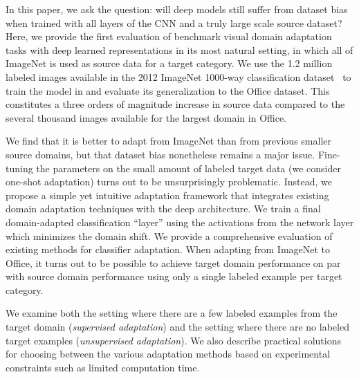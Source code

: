 In this paper, we ask the question: will deep models still suffer from dataset
bias when trained with all layers of the CNN and a truly large scale source
dataset?
Here, we provide the first evaluation of benchmark visual domain adaptation tasks
with deep learned representations in its most natural setting, in which all of
ImageNet is used as source data for a target category.  We use the 1.2 million
labeled images available in the 2012 ImageNet 1000-way classification
dataset~\cite{ilsvrc2012} to train the model in \cite{supervision} and evaluate
its generalization to the Office dataset. This constitutes a three
orders of magnitude increase in source data compared to the several thousand
images available for the largest domain in Office.

We find that it is better to adapt from ImageNet than from previous smaller source domains, but  that dataset bias nonetheless remains a major issue. Fine-tuning the parameters on the small amount of labeled target data (we consider one-shot adaptation) turns out to be unsurprisingly problematic. Instead, we propose a simple yet intuitive adaptation framework that integrates existing domain adaptation techniques with the deep architecture. We train a final domain-adapted classification ``layer'' using the activations from the network layer which minimizes the domain shift. 
We provide a comprehensive evaluation of existing methods for classifier adaptation.
When adapting from ImageNet to Office, it turns out to be possible to achieve target domain performance on par with source domain performance using only a single labeled example per target category. 

We examine both the setting where there are a few labeled examples from the target domain (\emph{supervised adaptation}) and the setting where there are no labeled target examples (\emph{unsupervised adaptation}). We also describe practical solutions for choosing between the various adaptation methods based on experimental constraints such as limited computation time. 
